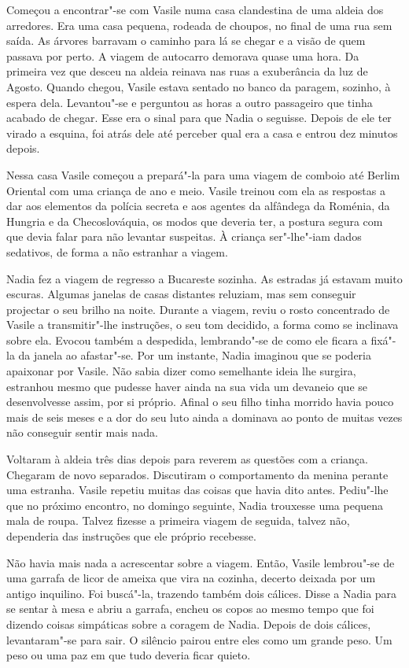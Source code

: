 Começou a encontrar"-se com Vasile numa casa clandestina de uma aldeia
dos arredores. Era uma casa pequena, rodeada de choupos, no final de uma
rua sem saída. As árvores barravam o caminho para lá se chegar e a visão
de quem passava por perto. A viagem de autocarro demorava quase uma
hora. Da primeira vez que desceu na aldeia reinava nas ruas a
exuberância da luz de Agosto. Quando chegou, Vasile estava sentado no
banco da paragem, sozinho, à espera dela. Levantou"-se e perguntou as
horas a outro passageiro que tinha acabado de chegar. Esse era o sinal
para que Nadia o seguisse. Depois de ele ter virado a esquina, foi atrás
dele até perceber qual era a casa e entrou dez minutos depois.

Nessa casa Vasile começou a prepará"-la para uma viagem de comboio até
Berlim Oriental com uma criança de ano e meio. Vasile treinou com ela as
respostas a dar aos elementos da polícia secreta e aos agentes da
alfândega da Roménia, da Hungria e da Checoslováquia, os modos que
deveria ter, a postura segura com que devia falar para não levantar
suspeitas. À criança ser"-lhe"-iam dados sedativos, de forma a não
estranhar a viagem.

Nadia fez a viagem de regresso a Bucareste sozinha. As estradas já
estavam muito escuras. Algumas janelas de
casas distantes reluziam, mas sem conseguir projectar o seu brilho na
noite. Durante a viagem, reviu o rosto concentrado de Vasile a
transmitir"-lhe instruções, o seu tom decidido, a forma como se inclinava
sobre ela. Evocou também a despedida, lembrando"-se de como ele ficara a
fixá"-la da janela ao afastar"-se. Por um instante, Nadia imaginou que
se poderia apaixonar por Vasile. Não sabia dizer como semelhante ideia
lhe surgira, estranhou mesmo que pudesse haver ainda na sua vida um
devaneio que se desenvolvesse assim, por si próprio. Afinal o seu
filho tinha morrido havia pouco mais de seis meses e a dor do seu luto
ainda a dominava ao ponto de muitas vezes não conseguir sentir mais
nada.

Voltaram à aldeia três dias depois para reverem as questões com a
criança. Chegaram de novo separados. Discutiram o comportamento da
menina perante uma estranha. Vasile repetiu muitas das coisas que havia
dito antes. Pediu"-lhe que no próximo encontro, no domingo seguinte,
Nadia trouxesse uma pequena mala de roupa. Talvez fizesse a primeira
viagem de seguida, talvez não, dependeria das instruções que ele
próprio recebesse.

Não havia mais nada a acrescentar sobre a viagem. Então, Vasile
lembrou"-se de uma garrafa de licor de ameixa que vira na cozinha,
decerto deixada por um antigo inquilino. Foi buscá"-la, trazendo também
dois cálices. Disse a Nadia para se sentar à mesa e abriu a garrafa,
encheu os copos ao mesmo tempo que foi dizendo coisas simpáticas sobre a
coragem de Nadia. Depois de dois cálices, levantaram"-se para sair. O
silêncio pairou entre eles como um grande peso. Um peso ou uma paz em
que tudo deveria ficar quieto.

